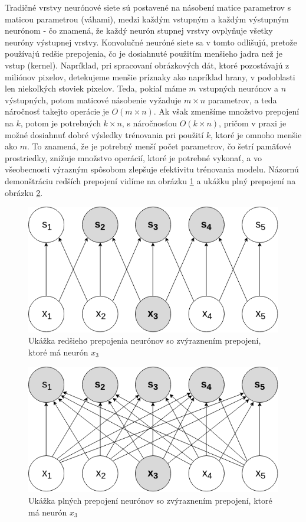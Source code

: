 \indent Tradičné vrstvy neurónové siete sú postavené na násobení matice parametrov s maticou parametrou (váhami), medzi každým vstupným a každým výstupným neurónom - čo znamená, že každý neurón stupnej vrstvy ovplyňuje všetky neuróny výstupnej vrstvy.
Konvolučné neuróné siete sa v tomto odlišujú, pretože používajú redšie prepojenia, čo je dosiahnuté použitím menšieho jadra než je vstup (kernel).
Napríklad, pri spracovaní obrázkových dát, ktoré pozostávajú z miliónov pixelov, detekujeme menšie príznaky ako napríklad hrany, v podoblasti len niekoľkých stoviek pixelov. \cite{goodfellow2016deep}
Teda, pokiaľ máme $m$ vstupných neurónov a $n$ výstupných, potom maticové násobenie vyžaduje $m \times n$ parametrov, a teda náročnosť takejto operácie je $O(m \times n)$.
Ak však zmenšíme množstvo prepojení na $k$, potom je potrebných $k \times n$, s náročnosťou $O(k \times n)$, pričom v praxi je možné dosiahnuť dobré výsledky trénovania pri použití $k$, ktoré je omnoho menšie ako $m$.
To znamená, že je potrebný menší počet parametrov, čo šetrí pamäťové prostriedky, znižuje množstvo operácií, ktoré je potrebné vykonať, a vo všeobecnosti výrazným spôsobom zlepšuje efektivitu trénovania modelu.
Názornú demonštráciu redších prepojení vidíme na obrázku \ref{fig:sparse} a ukážku plný prepojení na obrázku \ref{fig:fully}. 
 
\begin{figure}[H]
	\centering
	\includegraphics[width=0.5\linewidth]{img/sparse}
	\caption{Ukážka redšieho prepojenia neurónov so zvýraznením prepojení, ktoré má neurón $x_{3}$ }
	\label{fig:sparse}
\end{figure}

\begin{figure}[H]
	\centering
	\includegraphics[width=0.5\linewidth]{img/fully}
	\caption{Ukážka plných prepojení neurónov so zvýraznením prepojení, ktoré má neurón $x_{3}$} 
	\label{fig:fully}
\end{figure}

